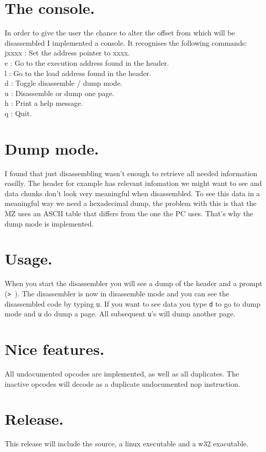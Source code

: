 \documentclass{article}
\begin{document}
\section{The console.}
In order to give the user the chance to alter the offset from which will be
disassembled I implemented a console. It recognises the following commands: \\
jxxxx : Set the address pointer to xxxx. \\
e     : Go to the execution address found in the header. \\
l     : Go to the load address found in the header. \\
d     : Toggle disassemble / dump mode. \\
u     : Disassemble or dump one page. \\
h     : Print a help message. \\
q     : Quit. \\

\section{Dump mode.}
I found that just disassembling wasn't enough to retrieve all needed
information easilly. The header for example has relevant infomation we might
want to see and data chunks don't look very meaningful when disassembled. To 
see this data in a meaningful way we need a hexadecimal dump, the problem with 
this is that the MZ uses an ASCII table that differs from the one the PC uses. 
That's why the dump mode is implemented.

\section{Usage.}
When you start the disassembler you will see a dump of the header and a prompt
(\verb+> +). The disassembler is now in disassemble mode and you can see the
disassembled code by typing \verb+u+. If you want to see data you type \verb+d+
to go to dump mode and \verb+u+ do dump a page. All subsequent \verb+u+'s will
dump another page. 

\section{Nice features.}
All undocumented opcodes are implemented, as well as all duplicates. The 
inactive opcodes will decode as a duplicate undocumented nop instruction.

\section{Release.}
This release will include the source, a linux executable and a w32 exacutable.
\end{document}
